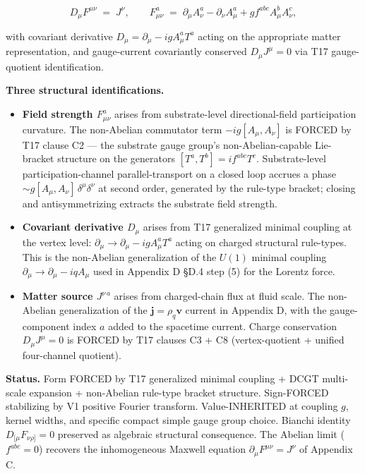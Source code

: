 \documentclass[
]{article}
\providecommand{\tightlist}{%
  \setlength{\itemsep}{0pt}\setlength{\parskip}{0pt}}
\begin{document}
\[\boxed{\;D_\mu F^{\mu\nu} \;=\; J^\nu, \qquad F_{\mu\nu}^a \;=\; \partial_\mu A_\nu^a - \partial_\nu A_\mu^a + gf^{abc}A_\mu^b A_\nu^c,\;}\]

with covariant derivative \(D_\mu = \partial_\mu - igA_\mu^a T^a\)
acting on the appropriate matter representation, and gauge-current
covariantly conserved \(D_\mu J^\mu = 0\) via T17 gauge-quotient
identification.

\textbf{Three structural identifications.}

\begin{itemize}
\tightlist
\item
  \textbf{Field strength \(F_{\mu\nu}^a\)} arises from substrate-level
  directional-field participation curvature. The non-Abelian commutator
  term \(-ig[A_\mu, A_\nu]\) is FORCED by T17 clause C2 --- the
  substrate gauge group's non-Abelian-capable Lie-bracket structure on
  the generators \([T^a, T^b] = if^{abc}T^c\). Substrate-level
  participation-channel parallel-transport on a closed loop accrues a
  phase \(\sim g[A_\mu, A_\nu]\,\delta^\mu\delta^\nu\) at second order,
  generated by the rule-type bracket; closing and antisymmetrizing
  extracts the substrate field strength.
\item
  \textbf{Covariant derivative \(D_\mu\)} arises from T17 generalized
  minimal coupling at the vertex level:
  \(\partial_\mu \to \partial_\mu - igA_\mu^a T^a\) acting on charged
  structural rule-types. This is the non-Abelian generalization of the
  \(U(1)\) minimal coupling \(\partial_\mu \to \partial_\mu - iqA_\mu\)
  used in Appendix D §D.4 step (5) for the Lorentz force.
\item
  \textbf{Matter source \(J^{\nu\,a}\)} arises from charged-chain flux
  at fluid scale. The non-Abelian generalization of the
  \(\mathbf{j} = \rho_q\mathbf{v}\) current in Appendix D, with the
  gauge-component index \(a\) added to the spacetime current. Charge
  conservation \(D_\mu J^\mu = 0\) is FORCED by T17 clauses C3 + C8
  (vertex-quotient + unified four-channel quotient).
\end{itemize}

\textbf{Status.} Form FORCED by T17 generalized minimal coupling + DCGT
multi-scale expansion + non-Abelian rule-type bracket structure.
Sign-FORCED stabilizing by V1 positive Fourier transform.
Value-INHERITED at coupling \(g\), kernel widths, and specific compact
simple gauge group choice. Bianchi identity \(D_{[\mu}F_{\nu\rho]} = 0\)
preserved as algebraic structural consequence. The Abelian limit
(\(f^{abc} = 0\)) recovers the inhomogeneous Maxwell equation
\(\partial_\mu F^{\mu\nu} = J^\nu\) of Appendix C.
\end{document}
